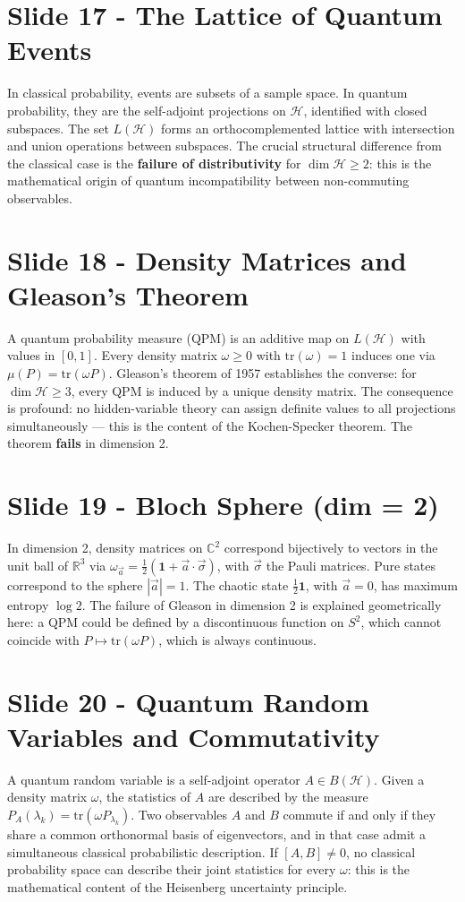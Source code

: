 \documentclass{article}
\begin{document}
\section*{Slide 17 - The Lattice of Quantum Events}
In classical probability, events are subsets of a sample space. In quantum probability, they are the self-adjoint projections on $\mathcal{H}$, identified with closed subspaces. The set $L(\mathcal{H})$ forms an orthocomplemented lattice with intersection and union operations between subspaces. The crucial structural difference from the classical case is the \textbf{failure of distributivity} for $\dim \mathcal{H} \geq 2$: this is the mathematical origin of quantum incompatibility between non-commuting observables.
\newpage

\section*{Slide 18 - Density Matrices and Gleason's Theorem}
A quantum probability measure (QPM) is an additive map on $L(\mathcal{H})$ with values in $[0,1]$. Every density matrix $\omega \geq 0$ with $\mathrm{tr}(\omega) = 1$ induces one via $\mu(P) = \mathrm{tr}(\omega P)$. Gleason's theorem of 1957 establishes the converse: for $\dim \mathcal{H} \geq 3$, every QPM is induced by a unique density matrix. The consequence is profound: no hidden-variable theory can assign definite values to all projections simultaneously — this is the content of the Kochen-Specker theorem. The theorem \textbf{fails} in dimension 2.

\section*{Slide 19 - Bloch Sphere (dim = 2)}
In dimension 2, density matrices on $\mathbb{C}^2$ correspond bijectively to vectors in the unit ball of $\mathbb{R}^3$ via $\omega_{\vec{a}} = \frac{1}{2}(\mathbf{1} + \vec{a} \cdot \vec{\sigma})$, with $\vec{\sigma}$ the Pauli matrices. Pure states correspond to the sphere $|\vec{a}|=1$. The chaotic state $\frac{1}{2}\mathbf{1}$, with $\vec{a} = 0$, has maximum entropy $\log 2$. The failure of Gleason in dimension 2 is explained geometrically here: a QPM could be defined by a discontinuous function on $S^2$, which cannot coincide with $P \mapsto \mathrm{tr}(\omega P)$, which is always continuous.

\section*{Slide 20 - Quantum Random Variables and Commutativity}
A quantum random variable is a self-adjoint operator $A \in B(\mathcal{H})$. Given a density matrix $\omega$, the statistics of $A$ are described by the measure $P_A(\lambda_k) = \mathrm{tr}(\omega P_{\lambda_k})$. Two observables $A$ and $B$ commute if and only if they share a common orthonormal basis of eigenvectors, and in that case admit a simultaneous classical probabilistic description. If $[A, B] \neq 0$, no classical probability space can describe their joint statistics for every $\omega$: this is the mathematical content of the Heisenberg uncertainty principle.
\end{document}
